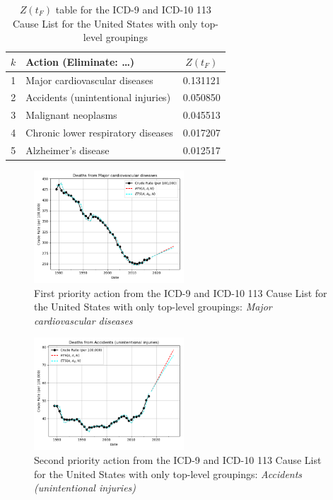 \documentclass[10pt, a4paper, twocolumn]{IEEEconf}
\begin{document}
\begin{table}[H]
  \centering
  \begin{tabular}{clc}
    \toprule
      $k$ & Action (Eliminate: \ldots) & $Z(t_F)$ \\
    \midrule
      1 &      Major cardiovascular diseases & 0.131121 \\
      2 & Accidents (unintentional injuries) & 0.050850 \\
      3 &                Malignant neoplasms & 0.045513 \\
      4 & Chronic lower respiratory diseases & 0.017207 \\
      5 &                Alzheimer's disease & 0.012517 \\
    \bottomrule
  \end{tabular}
  \caption{$Z(t_F)$ table for the ICD-9 and ICD-10 113 Cause List for the United States with only top-level groupings}
  \label{table:ztable3}
\end{table}

\begin{figure}[H]
  \centering
  \includegraphics[width=0.5\textwidth]{results/US_ICD_113_SELECTED_CAUSES_ROOTS/Major_cardiovascular_diseases_ets.png}
  \caption{First priority action from the ICD-9 and ICD-10 113 Cause List for the United States with only top-level groupings: \textit{Major cardiovascular diseases}}\label{fig:k4a}
\end{figure}

\begin{figure}[H]
  \centering
  \includegraphics[width=0.5\textwidth]{results/US_ICD_113_SELECTED_CAUSES_ROOTS/Accidents_unintentional_injuries_ets.png}
  \caption{Second priority action from the ICD-9 and ICD-10 113 Cause List for the United States with only top-level groupings: \textit{Accidents (unintentional injuries)}}\label{fig:k4b}
\end{figure}
\end{document}
